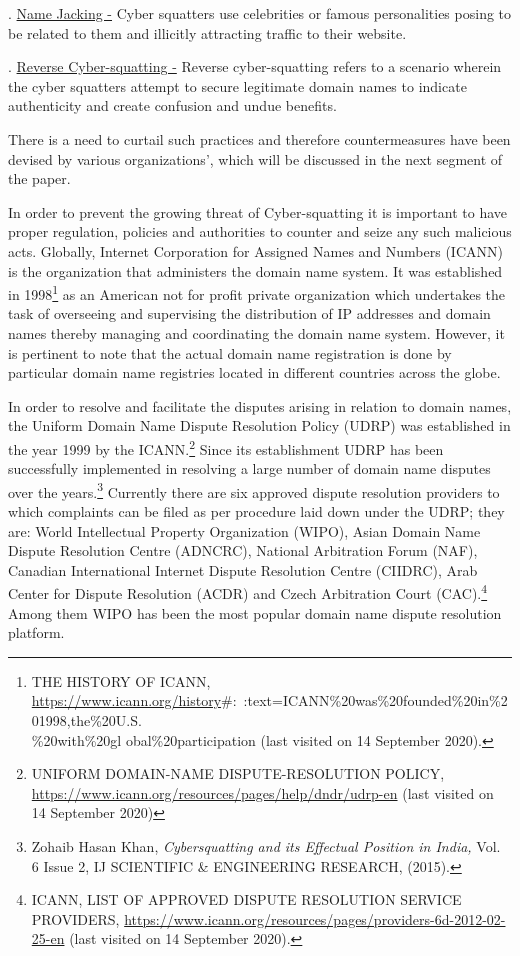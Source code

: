 \begin{multicols}{2}
. \underline{Name Jacking -} Cyber squatters use celebrities or famous personalities posing to be related
to them and illicitly attracting traffic to their website.

. \underline{Reverse Cyber-squatting -} Reverse cyber-squatting refers to a scenario wherein the cyber
squatters attempt to secure legitimate domain names to indicate authenticity and create
confusion and undue benefits.

\noi
There is a need to curtail such practices and therefore countermeasures have been devised by
various organizations’, which will be discussed in the next segment of the paper.


\noi
In order to prevent the growing threat of Cyber-squatting it is important to have proper
regulation, policies and authorities to counter and seize any such malicious acts. Globally,
Internet Corporation for Assigned Names and Numbers (ICANN) is the organization that
administers the domain name system. It was established in 1998\footnote{THE HISTORY OF ICANN, \url{https://www.icann.org/history}\#:~:text=ICANN\%20was\%20founded\%20in\%201998,the\%20U.S.\\\%20with\%20gl obal\%20participation (last visited on 14 September 2020).} as an American not for profit private organization which undertakes the task of overseeing and supervising the
distribution of IP addresses and domain names thereby managing and coordinating the
domain name system. However, it is pertinent to note that the actual domain name
registration is done by particular domain name registries located in different countries across
the globe.

\noi
In order to resolve and facilitate the disputes arising in relation to domain names, the Uniform
Domain Name Dispute Resolution Policy (UDRP) was established in the year 1999 by the
ICANN.\footnote{UNIFORM DOMAIN-NAME DISPUTE-RESOLUTION POLICY,
\url{https://www.icann.org/resources/pages/help/dndr/udrp-en} (last visited on 14 September 2020)} Since its establishment UDRP has been successfully implemented in resolving a
large number of domain name disputes over the years.\footnote{Zohaib Hasan Khan, \textit{Cybersquatting and its Effectual Position in India,} Vol. 6 Issue 2, IJ SCIENTIFIC \& ENGINEERING RESEARCH, (2015).} Currently there are six approved
dispute resolution providers to which complaints can be filed as per procedure laid down
under the UDRP; they are: World Intellectual Property Organization (WIPO), Asian Domain
Name Dispute Resolution Centre (ADNCRC), National Arbitration Forum (NAF), Canadian
International Internet Dispute Resolution Centre (CIIDRC), Arab Center for Dispute
Resolution (ACDR) and Czech Arbitration Court (CAC).\footnote{ICANN, LIST OF APPROVED DISPUTE RESOLUTION SERVICE PROVIDERS, \url{https://www.icann.org/resources/pages/providers-6d-2012-02-25-en} (last visited on 14 September 2020).} Among them WIPO has been the most popular domain name dispute resolution platform.


\end{multicols}
